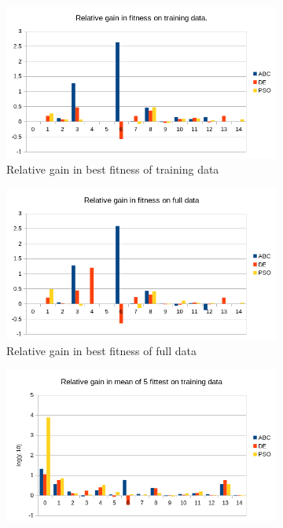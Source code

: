 \begin{figure}
    \centering
    \begin{subfigure}{0.6\textwidth}
    \centering
        \includegraphics[width=0.8\linewidth]{figures/hybrid_phases2_mintrainfitness.png}
        \caption{Relative gain in best fitness of training data}
    \end{subfigure}%
    \begin{subfigure}{0.6\textwidth}
    \centering
        \includegraphics[width=0.8\linewidth]{figures/hybrid_phases2_minfullfitness.png}
        \caption{Relative gain in best fitness of full data}
    \end{subfigure}
        \begin{subfigure}{0.6\textwidth}
    \centering
        \includegraphics[width=0.8\linewidth]{figures/hybrid_phases2_meantrainfitness.png}

\end{subfigure}
\end{figure}

